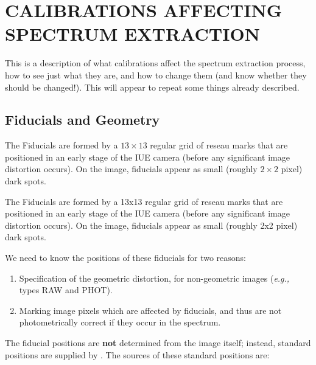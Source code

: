 \section{\label{se:extr_calib}CALIBRATIONS
         AFFECTING SPECTRUM EXTRACTION}

This is a description of what calibrations affect the spectrum
extraction process, how to see just what they are, and how to change them
(and know whether they should be changed!)\@.  This will appear to repeat some
things already described.


\subsection{Fiducials and Geometry}

\begin{latexonly}
The Fiducials are formed by a $13\times 13$ regular grid of reseau marks that
are positioned in an early stage of the IUE camera (before any significant
image distortion occurs). On the image, fiducials appear as small (roughly
$2\times 2$ pixel) dark spots.
\end{latexonly}

\begin{htmlonly}
The Fiducials are formed by a 13x13 regular grid of reseau marks that
are positioned in an early stage of the IUE camera (before any significant
image distortion occurs). On the image, fiducials appear as small (roughly
2x2 pixel) dark spots.
\end{htmlonly}

We need to know the positions of these fiducials for two reasons:

\begin{enumerate}

\item Specification of the geometric distortion, for non-geometric images
      ({\it{e.g.,}} types RAW and PHOT)\@.

\item Marking image pixels which are affected by fiducials, and thus are not
      photometrically correct if they occur in the spectrum.

\end{enumerate}

The fiducial positions are {\bf not} determined from the image itself; instead,
standard positions are supplied by \@.
The sources of these standard positions are:

